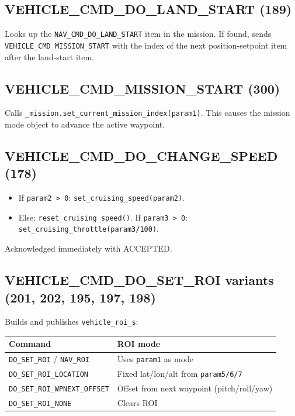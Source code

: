 \documentclass[12pt,a4paper]{article}
\begin{document}
\subsection{VEHICLE\_CMD\_DO\_LAND\_START (189)}

Looks up the \texttt{NAV\_CMD\_DO\_LAND\_START} item in the mission.
If found, sends \texttt{VEHICLE\_CMD\_MISSION\_START} with the index of the next
position-setpoint item after the land-start item.

\subsection{VEHICLE\_CMD\_MISSION\_START (300)}

Calls \texttt{\_mission.set\_current\_mission\_index(param1)}.
This causes the mission mode object to advance the active waypoint.

\subsection{VEHICLE\_CMD\_DO\_CHANGE\_SPEED (178)}

\begin{itemize}
  \item If \texttt{param2 > 0}: \texttt{set\_cruising\_speed(param2)}.
  \item Else: \texttt{reset\_cruising\_speed()}.
        If \texttt{param3 > 0}: \texttt{set\_cruising\_throttle(param3/100)}.
\end{itemize}
Acknowledged immediately with ACCEPTED.

\subsection{VEHICLE\_CMD\_DO\_SET\_ROI variants (201, 202, 195, 197, 198)}

Builds and publishes \texttt{vehicle\_roi\_s}:
\begin{center}\begin{tabular}{ll}\toprule
Command & ROI mode \\\midrule
\texttt{DO\_SET\_ROI} / \texttt{NAV\_ROI} & Uses \texttt{param1} as mode \\
\texttt{DO\_SET\_ROI\_LOCATION} & Fixed lat/lon/alt from \texttt{param5/6/7} \\
\texttt{DO\_SET\_ROI\_WPNEXT\_OFFSET} & Offset from next waypoint (pitch/roll/yaw) \\
\texttt{DO\_SET\_ROI\_NONE} & Clears ROI \\
\bottomrule\end{tabular}\end{center}
\end{document}
